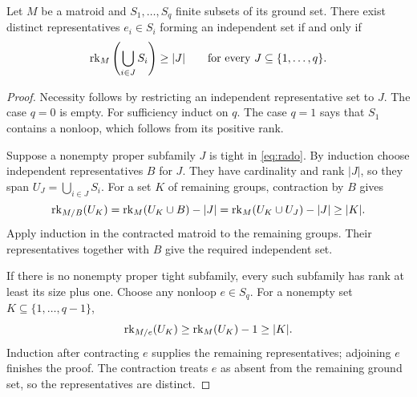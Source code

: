 \begin{lemma}\label{lem:rado}
Let $M$ be a matroid and $S_1,\ldots,S_q$ finite subsets of its ground set.
There exist distinct representatives $e_i\in S_i$ forming an independent
set if and only if
\begin{equation}\label{eq:rado}
       \operatorname{rk}_M\left(\bigcup_{i\in J}S_i\right)\geq |J|
       \qquad\text{for every }J\subseteq\{1,\ldots,q\}.
\end{equation}
\end{lemma}
\begin{proof}
Necessity follows by restricting an independent representative set to $J$.
The case $q=0$ is empty.  For sufficiency induct on $q$.  The case $q=1$
says that $S_1$ contains
a nonloop, which follows from its positive rank.

Suppose a nonempty proper subfamily $J$ is tight in \eqref{eq:rado}.
By induction choose independent representatives $B$ for $J$.  They have
cardinality and rank $|J|$, so they span $U_J=\bigcup_{i\in J}S_i$.
For a set $K$ of remaining groups, contraction by $B$ gives
\[
 \operatorname{rk}_{M/B}(U_K)
   =\operatorname{rk}_M(U_K\cup B)-|J|
   =\operatorname{rk}_M(U_K\cup U_J)-|J|
   \geq |K|.
\]
Apply induction in the contracted matroid to the remaining groups.  Their
representatives together with $B$ give the required independent set.

If there is no nonempty proper tight subfamily, every such subfamily has
rank at least its size plus one.  Choose any nonloop $e\in S_q$.
For a nonempty set $K\subseteq\{1,\ldots,q-1\}$,
\[
            \operatorname{rk}_{M/e}(U_K)\geq\operatorname{rk}_M(U_K)-1\geq |K|.
\]
Induction after contracting $e$ supplies the remaining representatives;
adjoining $e$ finishes the proof.  The contraction treats $e$ as absent
from the remaining ground set, so the representatives are distinct.
\end{proof}

